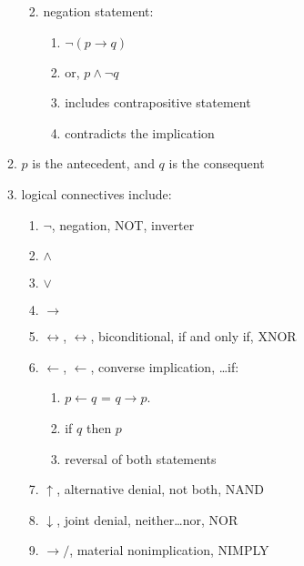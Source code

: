 \begin{enumerate}
\begin{enumerate}
\begin{enumerate}
\begin{enumerate}
			\end{enumerate}
		\item negation statement: \vspace{-0.1cm}
			\begin{enumerate} \itemsep -1pt
			\item $\neg (p \longrightarrow q)$
			\item or, $p \land \neg q$
			\item includes contrapositive statement
			\item contradicts the implication
			\end{enumerate}
		\end{enumerate}
	\item $p$ is the antecedent, and $q$ is the consequent
	\item logical connectives include: \vspace{-0.2cm}
		\begin{enumerate} \itemsep -2pt
		\item $\neg$, negation, NOT, inverter
		\item $\land$
		\item $\lor$
		\item $\rightarrow$
		\item $\leftrightarrow$, $\longleftrightarrow$, biconditional, if and only if, XNOR
		\item $\leftarrow$, $\longleftarrow$, converse implication, \dots if: \vspace{-0.1cm}
			\begin{enumerate} \itemsep -1pt
			\item $p \leftarrow q$ = $q \rightarrow p$.
			\item if $q$ then $p$
			\item reversal of both statements
			\end{enumerate}
		\item $\uparrow$, alternative denial, not both, NAND
		\item $\downarrow$, joint denial, neither\dots nor, NOR
		\item $\rightarrow/$, material nonimplication, NIMPLY
		\end{enumerate}
	\end{enumerate}
\end{enumerate}





